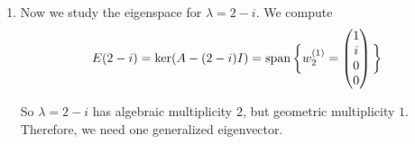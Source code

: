 \begin{example}
\begin{enumerate}
				We want to find $w_1^{(2)}$ satisfying
				\begin{equation}
					\underbrace{\begin{pmatrix}
						-i & -1 & 1 & 0 \\
						1 & -i & 0 & 1 \\
						0 & 0 & -i & -1 \\
						0 & 0 & 1 & -i
					\end{pmatrix}}_{A - (2+i)I}
					\underbrace{\begin{pmatrix}
						x_1 \\
						x_2 \\
						x_3 \\
						x_4
					\end{pmatrix}}_{w_1^{(2)}}
					=
					\underbrace{\begin{pmatrix}
						1 \\
						-i \\
						0 \\
						0
					\end{pmatrix}}_{w_1^{(1)}}
					\implies
					w_1^{(2)}
					=
					\begin{pmatrix}
						0 \\
						0 \\
						1 \\
						-i
					\end{pmatrix}
				\end{equation}

				Thus we have the Jordan chain
				\begin{equation}
					w_1^{(2)}
					\xrightarrow{A - (2+i)I}
					w_1^{(1)}
					\xrightarrow{A - (2+i)I}
					0
				\end{equation}

			\item Now we study the eigenspace for $\lambda = 2-i$. We compute
				\begin{equation}
					E(2-i) = \ker(A - (2-i)I)
					= \operatorname{span} \bigg\{
					w_2^{(1)} =
					\begin{pmatrix}
						1 \\
						i \\
						0 \\
						0
					\end{pmatrix}
					\bigg\}
				\end{equation}

				So $\lambda = 2-i$ has algebraic multiplicity $2$, but geometric multiplicity $1$. Therefore, we need one generalized eigenvector.


\end{enumerate}
\end{example}
